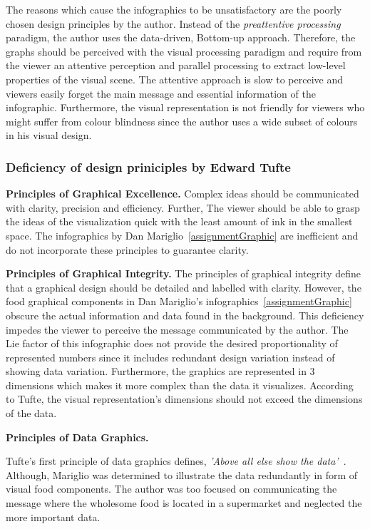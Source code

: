 The reasons which cause the infographics to be unsatisfactory are the poorly
chosen design principles by the author. Instead of the \textit{preattentive
processing} paradigm, the author uses the data-driven, Bottom-up approach.
Therefore, the graphs should be perceived with the visual processing paradigm
and require from the viewer an attentive perception and parallel processing to
extract low-level properties of the visual scene. The attentive approach is slow
to perceive and viewers easily forget the main message and essential information
of the infographic. Furthermore, the visual representation is not friendly for
viewers who might suffer from colour blindness since the author uses a wide
subset of colours in his visual design.

\subsubsection{Deficiency of design priniciples by Edward Tufte}

\textbf{Principles of Graphical Excellence.} Complex ideas should be
communicated with clarity, precision and efficiency. Further, The viewer should
be able to grasp the ideas of the visualization quick with the least amount of
ink in the smallest space. The infographics by Dan
Mariglio~\ref{assignmentGraphic} are inefficient and do not incorporate these
principles to guarantee clarity.

\textbf{Principles of Graphical Integrity.} The principles of graphical
integrity define that a graphical design should be detailed and labelled with
clarity. However, the food graphical components in Dan Mariglio's
infographics~\ref{assignmentGraphic} obscure the actual information and data
found in the background. This deficiency impedes the viewer to perceive the
message communicated by the author. The Lie factor of this infographic does not
provide the desired proportionality of represented numbers since it includes
redundant design variation instead of showing data variation. Furthermore, the
graphics are represented in 3 dimensions which makes it more complex than the
data it visualizes. According to Tufte, the visual representation's dimensions
should not exceed the dimensions of the data. 

\textbf{Principles of Data Graphics.}

Tufte's first principle of data graphics defines, \textit{'Above all else show
the data'}~\cite{Tufte2001}. Although, Mariglio was determined to illustrate the
data redundantly in form of visual food components. The author was too focused
on communicating the message where the wholesome food is located in a
supermarket and neglected the more important data.


